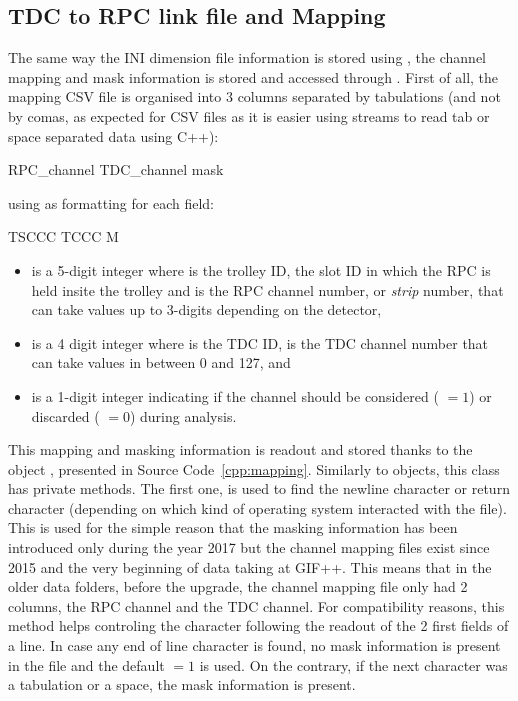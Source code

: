 	\subsection{TDC to RPC link file and Mapping}
	\label{app2:ssec:mapping}
	
	The same way the INI dimension file information is stored using , the channel mapping and mask information is stored and accessed through . First of all, the mapping CSV file is organised into 3 columns separated by tabulations (and not by comas, as expected for CSV files as it is easier using streams to read tab or space separated data using C++):\\
	
	\begin{textcode}
 RPC_channel	TDC_channel	mask
	\end{textcode}
	\vspace{5mm}
	
	using as formatting for each field:\\
	
	\begin{textcode}
 TSCCC	TCCC	M
	\end{textcode}
	
	\begin{itemize}
		\item[\textinline{TSCCC}] is a 5-digit integer where  is the trolley ID,  the slot ID in which the RPC is held insite the trolley  and  is the RPC channel number, or \textit{strip} number, that can take values up to 3-digits depending on the detector,
		\item[\textinline{TCCC}] is a 4 digit integer where  is the TDC ID,  is the TDC channel number that can take values in between 0 and 127, and
		\item[\textinline{M}] is a 1-digit integer indicating if the channel should be considered ( $=1$) or discarded ( $=0$) during analysis.
	\end{itemize}
	
	This mapping and masking information is readout and stored thanks to the object , presented in Source Code~\ref{cpp:mapping}. Similarly to  objects, this class has private methods. The first one,  is used to find the newline character  or return character  (depending on which kind of operating system interacted with the file). This is used for the simple reason that the masking information has been introduced only during the year 2017 but the channel mapping files exist since 2015 and the very beginning of data taking at GIF++. This means that in the older data folders, before the upgrade, the channel mapping file only had 2 columns, the RPC channel and the TDC channel. For compatibility reasons, this method helps controling the character following the readout of the 2 first fields of a line. In case any end of line character is found, no mask information is present in the file and the default  $=1$ is used. On the contrary, if the next character was a tabulation or a space, the mask information is present.
	
